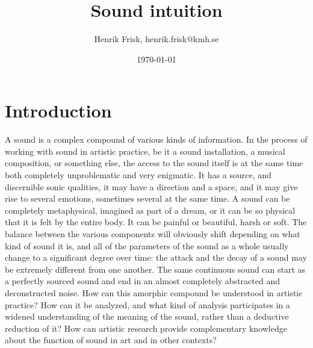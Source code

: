 \documentclass[11pt]{article}
\author{Henrik Frisk, henrik.frisk@kmh.se}
\date{\today}
\title{Sound intuition}
\begin{document}
\maketitle
\section*{Introduction}
\label{sec:org2c81488}
A sound is a complex compound of various kinds of information.
In the process of working with sound in artistic practice, be it a sound installation, a musical composition, or something else, the access to the sound itself is at the same time both completely unproblematic and very enigmatic.
It has a source, and discernible sonic qualities, it may have a direction and a space, and it may give rise to several emotions, sometimes several at the same time.
A sound can be completely metaphysical, imagined as part of a dream, or it can be so physical that it is felt by the entire body.
It can be painful or beautiful, harsh or soft.
The balance between the various components will obviously shift depending on what kind of sound it is, and all of the parameters of the sound as a whole usually change to a significant degree over time: the attack and the decay of a sound may be extremely different from one another.
The same continuous sound can start as a perfectly sourced sound and end in an almost completely abstracted and deconstructed noise.
How can this amorphic compound be understood in artistic practice? How can it be analyzed, and what kind of analysis participates in a widened understanding of the meaning of the sound, rather than a deductive reduction of it? How can artistic research provide complementary knowledge about the function of sound in art and in other contexts?
\end{document}
